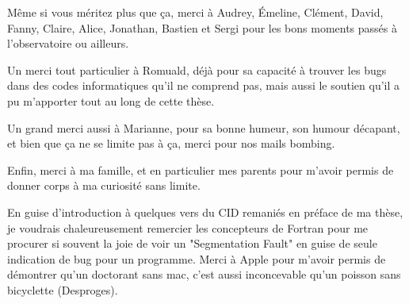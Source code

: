\bigskip

Même si vous méritez plus que ça, merci à Audrey, Émeline, Clément, David, Fanny, Claire,
Alice, Jonathan, Bastien et
Sergi pour les bons moments passés à l'observatoire ou ailleurs. 

Un merci tout particulier à Romuald, déjà pour sa capacité à trouver les bugs dans des codes informatiques qu'il ne comprend
pas, mais aussi le soutien qu'il a pu m'apporter tout au long de cette thèse. 

Un grand merci aussi à Marianne, pour sa bonne humeur, son humour décapant, et bien que ça ne se limite pas à ça, merci pour nos
mails bombing. 

Enfin, merci à ma famille, et en particulier mes parents pour m'avoir permis de donner corps à ma curiosité sans limite. 

En guise d'introduction à quelques vers du CID remaniés en préface de ma thèse, je voudrais chaleureusement remercier les
concepteurs de Fortran pour me procurer si souvent la joie de voir un "Segmentation Fault" en guise de seule indication de bug
pour un programme. Merci à Apple pour m'avoir permis de démontrer qu'un doctorant sans mac, c'est aussi inconcevable qu'un
poisson sans bicyclette (\textcopyright Desproges). 


